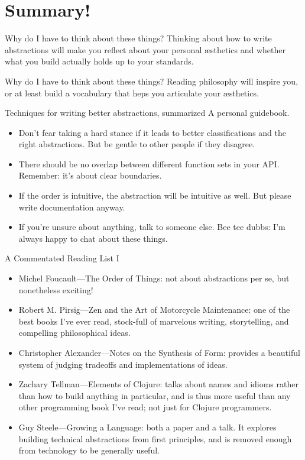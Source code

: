 \documentclass[aspectratio=169]{beamer}
\begin{document}
  \section{Summary!}
  \begin{frame}{Why do I have to think about these things?}
    Thinking about how to write abstractions will make you reflect about your
    personal æsthetics and whether what you build actually holds up to your
    standards.
  \end{frame}
  \begin{frame}{Why do I have to think about these things?}
    Reading philosophy will inspire you, or at least build a vocabulary that
    heps you articulate your æsthetics.
  \end{frame}
  \begin{frame}{Techniques for writing better abstractions, summarized}
    A personal guidebook.
    \begin{itemize}
      \item Don’t fear taking a hard stance if it leads to better
            classifications and the right abstractions. But be gentle to
            other people if they disagree.
      \item There should be no overlap between different function sets in
            your API. Remember: it’s about clear boundaries.
      \item If the order is intuitive, the abstraction will be intuitive as
            well. But please write documentation anyway.
      \item If you’re unsure about anything, talk to someone else. Bee tee
            dubbs: I’m always happy to chat about these things.
    \end{itemize}
  \end{frame}
  \begin{frame}{A Commentated Reading List I}
    \begin{itemize}
      \item Michel Foucault—The Order of Things: not about abstractions per se,
            but nonetheless exciting!
      \item Robert M. Pirsig—Zen and the Art of Motorcycle Maintenance: one of
            the best books I’ve ever read, stock-full of marvelous writing,
            storytelling, and compelling philosophical ideas.
      \item Christopher Alexander—Notes on the Synthesis of Form: provides a
            beautiful system of judging tradeoffs and implementations of ideas.
      \item Zachary Tellman—Elements of Clojure: talks about names and idioms
            rather than how to build anything in particular, and is thus more
            useful than any other programming book I’ve read; not just for
            Clojure programmers.
      \item Guy Steele—Growing a Language: both a paper and a talk. It explores
            building technical abstractions from first principles, and is
            removed enough from technology to be generally useful.
    \end{itemize}
  \end{frame}
\end{document}
